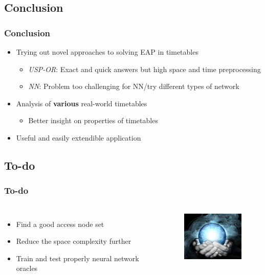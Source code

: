 \documentclass[]{beamer}
\begin{document}
        \subsection{Conclusion}
        \begin{frame}
            \frametitle{Conclusion}
			\begin{itemize}
				\item Trying out novel approaches to solving EAP in timetables
				\begin{itemize}
					\item \textit{USP-OR}: Exact and quick answers but high space and time preprocessing
					\item \textit{NN}: Problem too challenging for NN/try different types of network
				\end{itemize}
				\item Analysis of \textbf{various} real-world timetables
				\begin{itemize}
					\item Better insight on properties of timetables
				\end{itemize}
				\item Useful and easily extendible application
			\end{itemize}
        \end{frame}
        
        \subsection{To-do}
        \begin{frame}
            \frametitle{To-do}
            \begin{columns}[c]
            \column{2.9in}
				\begin{itemize}
					\item Find a good access node set
					\item Reduce the space complexity further
					\item Train and test properly neural network oracles
				\end{itemize}
			\column{2.1in}
				\begin{figure}[h!]
	                \includegraphics[height=1in]{crystall.jpg}
	            \end{figure}
			\end{columns}
        \end{frame}
        
\end{document}

